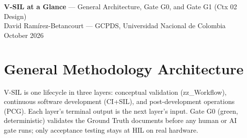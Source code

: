 \documentclass[11pt,a4paper]{article}
\begin{document}
\vspace*{-0.5cm}
{\large\textbf{V-SIL at a Glance} --- General Architecture, Gate G0, and Gate G1
(Ctx 02 Design)}\\[2pt]
{\small David Ramírez-Betancourt --- GCPDS, Universidad Nacional de Colombia
\quad\textbullet{} October 2026}
\vspace{0.3cm}

\section{General Methodology Architecture}

V-SIL is one lifecycle in three layers: conceptual validation (zz\_Workflow), continuous
software development (CI+SIL), and post-development operations (PCG). Each layer's terminal
output is the next layer's input. Gate G0 (green, deterministic) validates the Ground Truth
documents before any human or AI gate runs; only acceptance testing stays at HIL on real
hardware.
\end{document}
